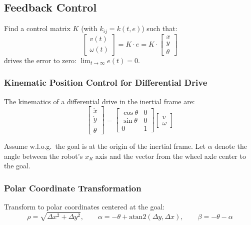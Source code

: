 \documentclass[11pt,a4paper]{article}
\theoremstyle{definition}
\theoremstyle{plain}
\theoremstyle{remark}
\begin{document}
\subsection{Feedback Control}

Find a control matrix $K$ (with $k_{ij} = k(t, e)$) such that:
\[
\begin{bmatrix} v(t) \\ \omega(t) \end{bmatrix} = K \cdot e = K \cdot \begin{bmatrix} x \\ y \\ \theta \end{bmatrix}
\]
drives the error to zero: $\lim_{t \to \infty} e(t) = 0$.

\subsubsection*{Kinematic Position Control for Differential Drive}

The kinematics of a differential drive in the inertial frame are:
\[
\begin{bmatrix} \dot{x} \\ \dot{y} \\ \dot{\theta} \end{bmatrix}
= \begin{bmatrix} \cos\theta & 0 \\ \sin\theta & 0 \\ 0 & 1 \end{bmatrix}
\begin{bmatrix} v \\ \omega \end{bmatrix}
\]

Assume w.l.o.g.\ the goal is at the origin of the inertial frame. Let $\alpha$ denote the angle between the robot's $x_R$ axis and the vector from the wheel axle center to the goal.

\subsubsection*{Polar Coordinate Transformation}

Transform to polar coordinates centered at the goal:
\[
\rho = \sqrt{\Delta x^2 + \Delta y^2}, \qquad \alpha = -\theta + \mathrm{atan2}(\Delta y, \Delta x), \qquad \beta = -\theta - \alpha
\]
\end{document}
